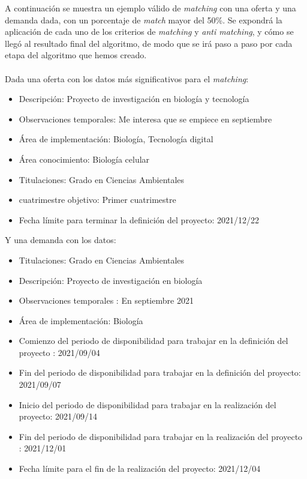 \documentclass[11pt]{book}
\begin{document}
A continuación se muestra un ejemplo válido de \emph{matching} con una oferta y una demanda dada, con un porcentaje de \emph{match} mayor del 50\%. Se expondrá la aplicación de cada uno de los criterios de \emph{matching} y \emph{anti matching}, y cómo se llegó al resultado final del algoritmo, de modo que se irá paso a paso por cada etapa del algoritmo que hemos creado.\\\\
Dada una oferta con los datos más significativos para el \emph{matching}:\\
\begin{itemize} 
	\item Descripción: Proyecto de investigación en biología y tecnología
	\item Observaciones temporales: Me interesa que se empiece en septiembre
	\item Área de implementación: Biología, Tecnología digital
	\item Área conocimiento: Biología celular
	\item Titulaciones: Grado en Ciencias Ambientales
	\item cuatrimestre objetivo: Primer cuatrimestre
	\item Fecha límite para terminar la definición del proyecto: 2021/12/22
	\\
\end{itemize}
Y una demanda con los datos:\\
\begin{itemize} 
	\item Titulaciones: Grado en Ciencias Ambientales
	\item Descripción: Proyecto de investigación en biología
	\item Observaciones temporales : En septiembre 2021
	\item Área de implementación: Biología
	\item Comienzo del periodo de disponibilidad para trabajar en la definición del
	proyecto : 2021/09/04
	\item Fin del periodo de disponibilidad para trabajar en la definición del
	proyecto: 2021/09/07
	\item Inicio del periodo de disponibilidad para trabajar en la realización del
	proyecto: 2021/09/14
	\item Fin del periodo de disponibilidad para trabajar en la realización del
	proyecto : 2021/12/01
	\item Fecha límite para el fin de la realización del proyecto: 2021/12/04
\end{itemize}
\end{document}
